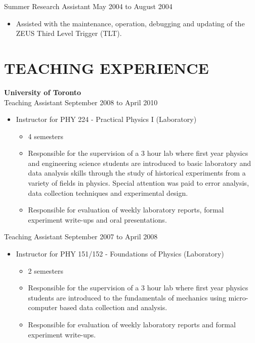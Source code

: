 \documentclass[margin]{res}
\begin{document}
\begin{resume}
Summer Research Assistant \hfill May 2004 to August 2004 \\

\begin{itemize}
\item Assisted with the maintenance, operation, debugging and updating of the ZEUS Third Level Trigger (TLT). 
\end{itemize}

\section{TEACHING EXPERIENCE}

{\bf University of Toronto} \\
Teaching Assistant \hfill September 2008 to April 2010 
\begin{itemize}
\item Instructor for PHY 224 - Practical  Physics I (Laboratory)
  \begin{itemize}
    \item 4 semesters
    \item Responsible for the supervision of a 3 hour lab where first year physics and engineering science students are introduced to basic laboratory and data analysis skills through the study of historical experiments from a variety of fields in physics.  Special attention was paid to error analysis, data collection techniques and experimental design.
    \item Responsible for evaluation of weekly laboratory reports, formal experiment write-ups and oral presentations.
  \end{itemize}
\end{itemize}

Teaching Assistant \hfill September 2007 to April 2008 
\begin{itemize}
\item Instructor for PHY 151/152 - Foundations of Physics  (Laboratory)
  \begin{itemize}
    \item 2 semesters
    \item Responsible for the supervision of a 3 hour lab where first year physics students are introduced to the fundamentals of mechanics using micro-computer based data collection and analysis.
    \item Responsible for evaluation of weekly laboratory reports and formal experiment write-ups.
  \end{itemize}
\end{itemize}



\end{resume}
\end{document}
